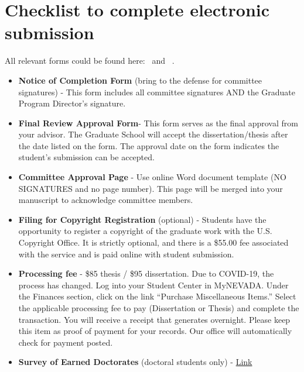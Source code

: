 \section{Checklist to complete electronic submission}
All relevant forms could be found here:~\cite{unr-2020} and ~\cite{unr-2020-forms}.
\begin{itemize}
    \item \textbf{Notice of Completion Form} (bring to the defense for committee signatures) - This form includes all committee signatures AND the Graduate Program Director’s signature.
    \item \textbf{Final Review Approval Form}- This form serves as the final approval from your advisor. The Graduate School will accept the dissertation/thesis after the date listed on the form. The approval date on the form indicates the student’s submission can be accepted.
    \item \textbf{Committee Approval Page} - Use online Word document template (NO SIGNATURES and no page number). This page will be merged into your manuscript to acknowledge committee members.
    \item \textbf{Filing for Copyright Registration} (optional) - Students have the opportunity to register a copyright of the graduate work with the U.S. Copyright Office. It is strictly optional, and there is a \$55.00 fee associated with the service and is paid online with student submission.
    \item \textbf{Processing fee} - \$85 thesis / \$95 dissertation. Due to COVID-19, the process has changed. Log into your Student Center in MyNEVADA. Under the Finances section, click on the link “Purchase Miscellaneous Items.” Select the applicable processing fee to pay (Dissertation or Thesis) and complete the transaction. You will receive a receipt that generates overnight.  Please keep this item as proof of payment for your records. Our office will automatically check for payment posted.
    \item \textbf{Survey of Earned Doctorates} (doctoral students only) - \href{https://sed-ncses.org/login.aspx}{Link}
\end{itemize}